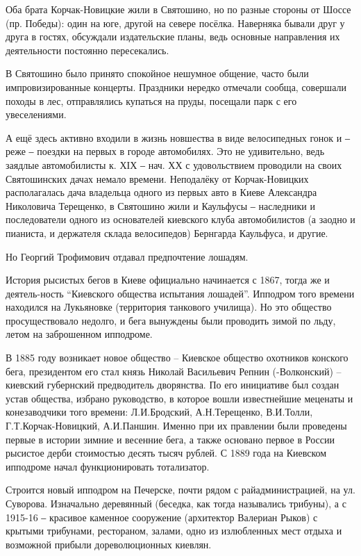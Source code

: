 Оба брата Корчак-Новицкие жили в Святошино, но по разные стороны от Шоссе (пр.
Победы): один на юге, другой на севере посёлка. Наверняка бывали друг у друга в
гостях, обсуждали издательские планы, ведь основные направления их деятельности
постоянно пересекались. 

В Святошино было принято спокойное нешумное общение, часто были
импровизированные концерты. Праздники нередко отмечали сообща, совершали походы
в лес, отправлялись купаться на пруды, посещали парк с его увеселениями. 

А ещё здесь активно входили в жизнь новшества в виде велосипедных гонок и ‒
реже ‒ поездки на первых в городе автомобилях. Это не удивительно, ведь заядлые
автомобилисты к. ХІХ ‒ нач. ХХ с удовольствием проводили на своих Святошинских
дачах немало времени. Неподалёку от Корчак-Новицких располагалась дача
владельца одного из первых авто в Киеве Александра Николовича Терещенко, в
Святошино жили и Каульфусы ‒ наследники и последователи одного из основателей
киевского клуба автомобилистов (а заодно и пианиста, и держателя склада
велосипедов) Бернгарда Каульфуса, и другие.

Но Георгий Трофимович отдавал предпочтение лошадям. 

История рысистых бегов в Киеве официально начинается с 1867, тогда же и
деятель-ность \enquote{Киевского общества испытания лошадей}. Ипподром того времени
находился на Лукьяновке (территория танкового училища). Но это общество
просуществовало недолго, и бега вынуждены были проводить зимой по льду, летом
на заброшенном ипподроме. 

В 1885 году возникает новое общество – Киевское общество охотников конского
бега, президентом его стал князь Николай Васильевич Репнин (-Волконский) –
киевский губернский предводитель дворянства. По его инициативе был создан устав
общества, избрано руководство, в которое вошли известнейшие меценаты и
конезаводчики того времени: Л.И.Бродский, А.Н.Терещенко, В.И.Толли,
Г.Т.Корчак-Новицкий, А.И.Паншин. Именно при их правлении были проведены первые
в истории зимние и весенние бега, а также основано первое в России рысистое
дерби стоимостью десять тысяч рублей. С 1889 года на Киевском ипподроме начал
функционировать тотализатор.

Строится новый ипподром на Печерске, почти рядом с райадминистрацией, на ул.
Суворова. Изначально деревянный (беседка, как тогда назывались трибуны), а с
1915-16 ‒ красивое каменное сооружение (архитектор Валериан Рыков) с крытыми
трибунами, рестораном, залами, одно из излюбленных мест отдыха и возможной
прибыли дореволюционных киевлян.

